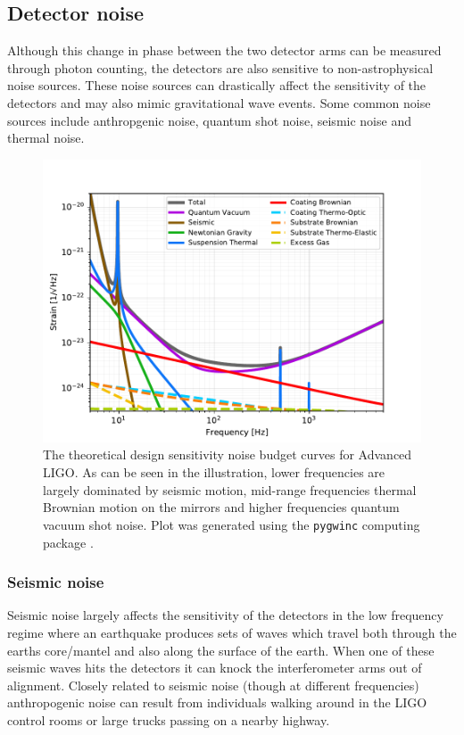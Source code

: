 \subsection{Detector noise}

Although this change in phase between 
the two detector arms can be measured through 
photon counting, the detectors are 
also sensitive to non-astrophysical noise 
sources. These noise sources can drastically affect 
the sensitivity of the detectors and may also mimic 
gravitational wave events. Some common noise sources 
include anthropgenic noise, quantum shot noise, 
seismic noise and thermal noise. 

\begin{figure}
    \centering
    \includegraphics[width=\linewidth]{figures/aLIGO_noise_budget.pdf}
    \caption{The theoretical design sensitivity noise budget curves for Advanced \ac{LIGO}. As can be seen in the illustration, lower frequencies are largely dominated by seismic motion, mid-range frequencies thermal Brownian motion on the mirrors and higher frequencies quantum vacuum shot noise. Plot was generated using the \texttt{pygwinc} computing package \cite{pygwinc}. }
    \label{fig:gw_plus_cross}
\end{figure}

\subsubsection{Seismic noise}
Seismic noise largely affects the sensitivity of 
the detectors in the low frequency regime where 
an earthquake produces sets of waves which travel both 
through the earths core/mantel and also along the 
surface of the earth. When one of these seismic waves 
hits the detectors it can knock the interferometer arms 
out of alignment. Closely related to seismic noise 
(though at different frequencies) anthropogenic noise 
can result from individuals walking around in the 
\ac{LIGO} control rooms or large trucks passing 
on a nearby highway.

